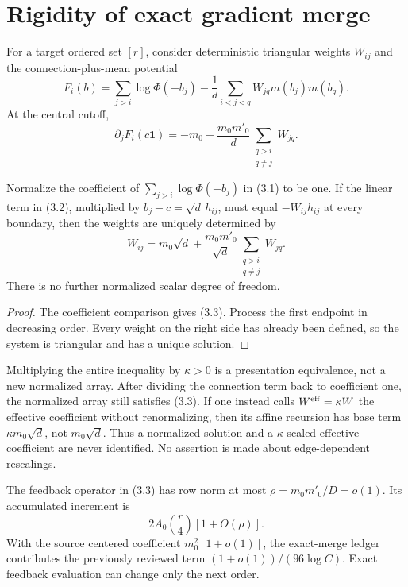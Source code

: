 \section{Rigidity of exact gradient merge}\label{sec:rigidity}

For a target ordered set \([r]\), consider deterministic triangular weights
\(W_{ij}\) and the connection-plus-mean potential
\[
F_i(b)=\sum_{j>i}\log\Phi(-b_j)
-\frac1d\sum_{i<j<q}W_{jq}m(b_j)m(b_q).
\tag{3.1}
\]
At the central cutoff,
\[
 \partial_jF_i(c\mathbf1)
 =-m_0-\frac{m_0m'_0}{d}
 \sum_{\substack{q>i\\q\ne j}}W_{jq}.
\tag{3.2}
\]

\begin{proposition}\label{prop:rigidity}
Normalize the coefficient of
\(\sum_{j>i}\log\Phi(-b_j)\) in (3.1) to be one.  If the linear term in
(3.2), multiplied by
\(b_j-c=\sqrt d\,h_{ij}\), must equal \(-W_{ij}h_{ij}\) at every boundary,
then the weights are uniquely determined by
\[
 W_{ij}=m_0\sqrt d+
 \frac{m_0m'_0}{\sqrt d}
 \sum_{\substack{q>i\\q\ne j}}W_{jq}.
\tag{3.3}
\]
There is no further normalized scalar degree of freedom.
\end{proposition}

\begin{proof}
The coefficient comparison gives (3.3).  Process the first endpoint in
decreasing order.  Every weight on the right side has already been defined,
so the system is triangular and has a unique solution.
\end{proof}

\begin{remark}\label{rem:global-scale}
Multiplying the entire inequality by \(\kappa>0\) is a presentation
equivalence, not a new normalized array.  After dividing the connection term
back to coefficient one, the normalized array still satisfies (3.3).  If one
instead calls \(W^{\rm eff}=\kappa W\) the effective coefficient without
renormalizing, then its affine recursion has base term
\(\kappa m_0\sqrt d\), not \(m_0\sqrt d\).  Thus a normalized solution and a
\(\kappa\)-scaled effective coefficient are never identified.  No assertion
is made about edge-dependent rescalings.
\end{remark}

The feedback operator in (3.3) has row norm at most
\(\rho=m_0m'_0/D=o(1)\).  Its accumulated increment is
\[
 2A_0\binom r4[1+O(\rho)].
\tag{3.4}
\]
With the source centered coefficient \(m_0^2[1+o(1)]\), the exact-merge
ledger contributes the previously reviewed term
\((1+o(1))/(96\log C)\).  Exact feedback evaluation can change only the
next order.
